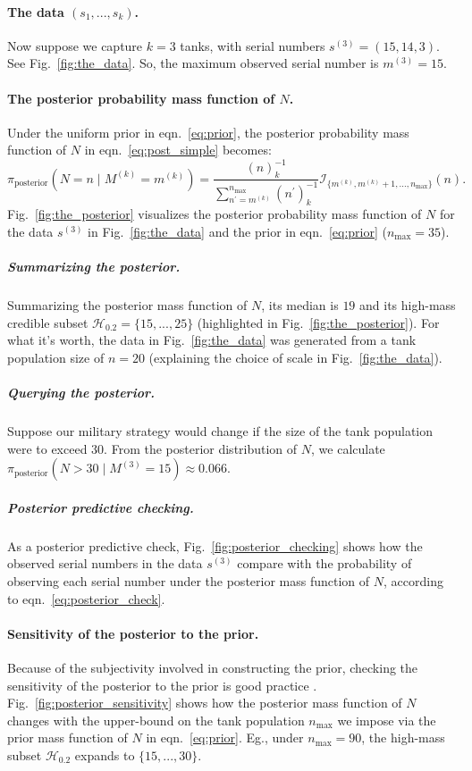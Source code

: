 \documentclass[11pt, oneside]{article}
\newcommand{\data}{$(s_1, ..., s_k)$\xspace}
\begin{document}
\paragraph{The data \data.} Now suppose we capture $k=3$ tanks, with serial numbers $s^{(3)}=(15, 14, 3)$. See Fig.~\ref{fig:the_data}. So, the maximum observed serial number is $m^{(3)}=15$.

\paragraph{The posterior probability mass function of $N$.}
Under the uniform prior in eqn.~\ref{eq:prior}, the posterior probability mass function of $N$ in eqn.~\ref{eq:post_simple} becomes:
\begin{equation}
	\pi_{\text{posterior}}(N=n \mid M^{(k)}=m^{(k)})= 
		\dfrac{
			(n)_k^{-1}
			}{
			\displaystyle \sum_{ n^\prime = m^{(k)}}^{n_{\text{max}}} (n^\prime)_k^{-1}
		} \mathcal{I}_{ \{m^{(k)}, m^{(k)}+1, ..., n_\text{max}\} }(n).
\end{equation}
Fig.~\ref{fig:the_posterior} visualizes the posterior probability mass function of $N$ for the data $s^{(3)}$ in Fig.~\ref{fig:the_data} and the prior in eqn.~\ref{eq:prior} ($n_\text{max}=35$). 

\subparagraph{Summarizing the posterior.}
Summarizing the posterior mass function of $N$, its median is $19$ and its high-mass credible subset $\mathcal{H}_{0.2}=\{15, ..., 25\}$ (highlighted in Fig.~\ref{fig:the_posterior}). 
For what it's worth, the data in Fig.~\ref{fig:the_data} was generated from a tank population size of $n=20$ (explaining the choice of scale in Fig.~\ref{fig:the_data}). 

\subparagraph{Querying the posterior.} Suppose our military strategy would change if the size of the tank population were to exceed 30. From the posterior distribution of $N$, we calculate $\pi_{\text{posterior}}(N>30 \mid M^{(3)}=15)\approx 0.066$.

\subparagraph{Posterior predictive checking.} As a posterior predictive check, Fig.~\ref{fig:posterior_checking} shows how the observed serial numbers in the data $s^{(3)}$ compare with the probability of observing each serial number under the posterior mass function of $N$, according to eqn.~\ref{eq:posterior_check}.

\paragraph{Sensitivity of the posterior to the prior.} Because of the subjectivity involved in constructing the prior, checking the sensitivity of the posterior to the prior is good practice \cite{van2021bayesian}. Fig.~\ref{fig:posterior_sensitivity} shows how the posterior mass function of $N$ changes with the upper-bound on the tank population $n_\text{max}$ we impose via the prior mass function of $N$ in eqn.~\ref{eq:prior}. 
Eg., under $n_\text{max} =90$, the high-mass subset $\mathcal{H}_{0.2}$ expands to $\{15, ..., 30\}$.
\end{document}
